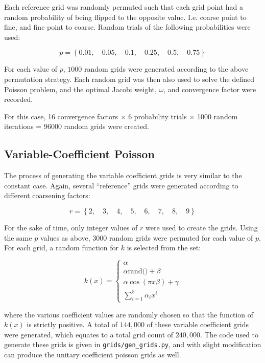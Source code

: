Each reference grid was randomly permuted such that each grid point had a random probability of being flipped to the opposite value.  I.e. coarse point to fine, and fine point to coarse.  Random trials of the following probabilities were used:

$$ p = \left\{0.01, \quad 0.05, \quad 0.1, \quad 0.25, \quad 0.5, \quad 0.75\right\} $$

For each value of $p$, $1000$ random grids were generated according to the above permutation strategy.  Each random grid was then also used to solve the defined Poisson problem, and the optimal Jacobi weight, $\omega$, and convergence factor were recorded.

For this case, 16 convergence factors $\times$ 6 probability trials $\times$ 1000 random iterations = 96000 random grids were created.

\subsection{Variable-Coefficient Poisson}

The process of generating the variable coefficient grids is very similar to the constant case.  Again, several ``reference'' grids were generated according to different coarsening factors:

$$r = \left\{
2,\quad
3,\quad
4,\quad
5,\quad
6,\quad
7,\quad
8,\quad
9
\right\}$$

For the sake of time, only integer values of $r$ were used to create the grids.  Using the same $p$ values as above, $3000$ random grids were permuted for each value of $p$.  For each grid, a random function for $k$ is selected from the set:

$$
k\left(x\right) = \begin{cases} \alpha \\ \alpha\text{rand()} + \beta \\ \alpha\cos\left(\pi x \beta\right) + \gamma\\ \sum_{i=1}^5 \alpha_i x^i \end{cases}
$$

where the various coefficient values are randomly chosen so that the function of $k\left(x\right)$ is strictly positive.  A total of $144,000$ of these variable coefficient grids were generated, which equates to a total grid count of $240,000$.  The code used to generate these grids is given in \texttt{grids/gen\_grids.py}, and with slight modification can produce the unitary coefficient poisson grids as well.


